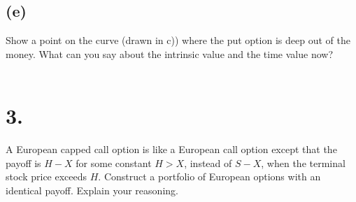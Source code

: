 \documentclass{article}
\begin{document}
{%


\subsection*{(e)}

Show a point on the curve (drawn in c)) where the put option is deep out of the money.  What can you say about the intrinsic value and the time value now? \\ \\


}

\section*{3.}
{\Large 

A European capped call option is like a European call option except that the payoff is $H - X$ for some constant $H > X$, instead of $S - X$, when the terminal stock price exceeds $H$.  Construct a portfolio of European options with an identical payoff. Explain your reasoning. \\ \\




}
\end{document}
